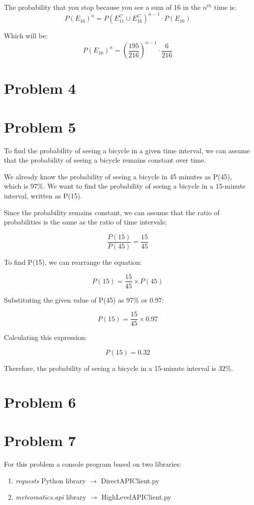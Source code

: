 	The probability that you stop because you see a sum of 16 in the $ n^{th} $ time is:
	\[
	P(E_{16})^{n} = P(E_{11}^{C} \cup E_{16}^{C})^{n-1} \cdot P(E_{16})
	\]
	
	Which will be:
	\[
	P(E_{16})^{n} = (\frac{195}{216})^{n-1} \cdot \frac{6}{216}
	\]

	\newpage
	\section*{Problem 4}\label{sec:prob-4}

	
	\newpage
	\section*{Problem 5}\label{sec:prob-5}
	To find the probability of seeing a bicycle in a given time interval, we can assume that the probability of seeing a bicycle remains constant over time. 
	
	We already know the probability of seeing a bicycle in 45 minutes as P(45), which is 97\%. We want to find the probability of seeing a bicycle in a 15-minute interval, written as P(15).
	
	Since the probability remains constant, we can assume that the ratio of probabilities is the same as the ratio of time intervals:
	
	\[
	\frac{{P(15)}}{{P(45)}} = \frac{{15}}{{45}}\]
	
	To find P(15), we can rearrange the equation:
	
	\[P(15) = \frac{{15}}{{45}} \times P(45)\]
	
	Substituting the given value of P(45) as 97\% or 0.97:
	
	\[P(15) = \frac{{15}}{{45}} \times 0.97\]
	
	Calculating this expression:
	
	\[P(15) = 0.32\]
	
	Therefore, the probability of seeing a bicycle in a 15-minute interval is 32\%.

	\newpage
	\section*{Problem 6}\label{sec:prob-6}


	\newpage
	\section*{Problem 7}\label{sec:prob-7}
	For this problem a console program based on two libraries:
	\begin{enumerate}
	\item 	\textit{requests} Python library $ \rightarrow $ DirectAPIClient.py
	\item 	\textit{meteomatics.api} library $ \rightarrow $ HighLevelAPIClient.py
	\end{enumerate}
	
